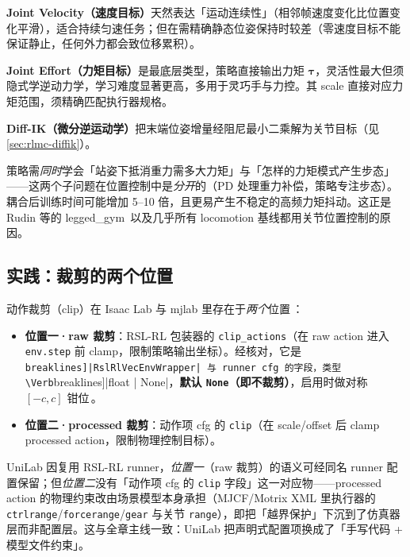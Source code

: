 \textbf{Joint Velocity（速度目标）}天然表达「运动连续性」（相邻帧速度变化比位置变化平滑），适合持续匀速任务；但在需精确静态位姿保持时较差（零速度目标不能保证静止，任何外力都会致位移累积）。

\textbf{Joint Effort（力矩目标）}是最底层类型，策略直接输出力矩 $\boldsymbol\tau$，灵活性最大但须隐式学逆动力学，学习难度显著更高，多用于灵巧手与力控。其 scale 直接对应力矩范围，须精确匹配执行器规格。

\textbf{Diff-IK（微分逆运动学）}把末端位姿增量经阻尼最小二乘解为关节目标（见 \cref{sec:rlmc-diffik}）。

\begin{insight}\label{ins:rlmc-counterfactual}
策略需\emph{同时}学会「站姿下抵消重力需多大力矩」与「怎样的力矩模式产生步态」——这两个子问题在位置控制中是\emph{分开}的（PD 处理重力补偿，策略专注步态）。耦合后训练时间可能增加 5--10 倍，且更易产生不稳定的高频力矩抖动。这正是 Rudin 等的 legged\_gym\,\cite{rudin2021minutes} 以及几乎所有 locomotion 基线都用关节位置控制的原因。
\end{insight}

\subsection{实践：裁剪的两个位置}
\label{sec:rlmc-clip}

动作裁剪（clip）在 Isaac Lab 与 mjlab 里存在于\emph{两个}位置\,\cite{isaaclab2024}：
\begin{itemize}
  \item \textbf{位置一·raw 裁剪}：RSL-RL 包装器的 \verb|clip_actions|（在 raw action 进入 \verb|env.step| 前 clamp，限制策略输出坐标）。经核对，它是 \Verb[breaklines]|RslRlVecEnvWrapper| 与 runner cfg 的字段，类型 \Verb[breaklines]|float | None|，\textbf{默认 \texttt{None}（即不裁剪）}，启用时做对称 $[-c,c]$ 钳位\,\cite{isaaclab2024}。
  \item \textbf{位置二·processed 裁剪}：动作项 cfg 的 \verb|clip|（在 scale/offset 后 clamp processed action，限制物理控制目标）。
\end{itemize}
UniLab 因复用 RSL-RL runner，\emph{位置一}（raw 裁剪）的语义可经同名 runner 配置保留；但\emph{位置二}没有「动作项 cfg 的 \verb|clip| 字段」这一对应物——processed action 的物理约束改由场景模型本身承担（MJCF/Motrix XML 里执行器的 \verb|ctrlrange|/\allowbreak\verb|forcerange|/\allowbreak\verb|gear| 与关节 \verb|range|），即把「越界保护」下沉到了仿真器层而非配置层。这与全章主线一致：UniLab 把声明式配置项换成了「手写代码 + 模型文件约束」。

